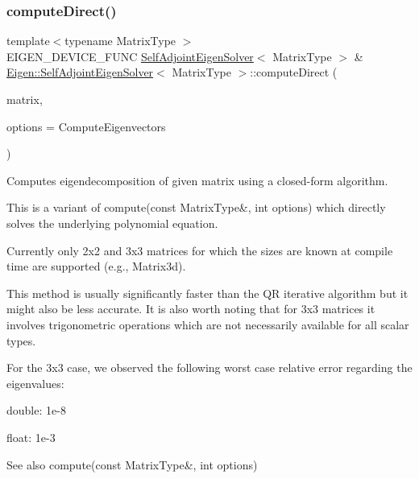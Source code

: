 \subsubsection{\texorpdfstring{computeDirect()}{computeDirect()}}
{\footnotesize\ttfamily template$<$typename Matrix\+Type $>$ \\
E\+I\+G\+E\+N\+\_\+\+D\+E\+V\+I\+C\+E\+\_\+\+F\+U\+NC \mbox{\hyperlink{class_eigen_1_1_self_adjoint_eigen_solver}{Self\+Adjoint\+Eigen\+Solver}}$<$ Matrix\+Type $>$ \& \mbox{\hyperlink{class_eigen_1_1_self_adjoint_eigen_solver}{Eigen\+::\+Self\+Adjoint\+Eigen\+Solver}}$<$ Matrix\+Type $>$\+::compute\+Direct (\begin{DoxyParamCaption}\item[{const Matrix\+Type \&}]{matrix,  }\item[{int}]{options = {\ttfamily ComputeEigenvectors} }\end{DoxyParamCaption})}



Computes eigendecomposition of given matrix using a closed-\/form algorithm. 

This is a variant of compute(const Matrix\+Type\&, int options) which directly solves the underlying polynomial equation.

Currently only 2x2 and 3x3 matrices for which the sizes are known at compile time are supported (e.\+g., Matrix3d).

This method is usually significantly faster than the QR iterative algorithm but it might also be less accurate. It is also worth noting that for 3x3 matrices it involves trigonometric operations which are not necessarily available for all scalar types.

For the 3x3 case, we observed the following worst case relative error regarding the eigenvalues\+:
\begin{DoxyItemize}
\item double\+: 1e-\/8
\item float\+: 1e-\/3
\end{DoxyItemize}

\begin{DoxySeeAlso}{See also}
compute(const Matrix\+Type\&, int options) 
\end{DoxySeeAlso}
\mbox{\label{class_eigen_1_1_self_adjoint_eigen_solver_a297893df7098c43278d385e4d4e23fe4}} 
